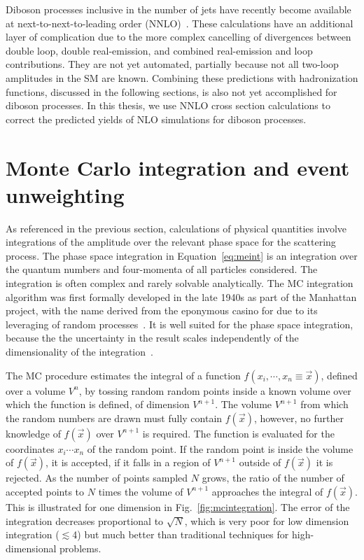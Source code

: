 Diboson processes inclusive in the number of jets have recently become available 
at next-to-next-to-leading order (NNLO)~\cite{Grazzini:2017mhc}. These calculations
have an additional layer of complication due to the more complex cancelling of
divergences between double loop, double real-emission, and combined real-emission
and loop contributions. They are not yet automated,
partially because not all two-loop amplitudes in the SM are known.
Combining these predictions with hadronization functions,
discussed in the following sections, is also not yet accomplished for diboson
processes. In this thesis, we use NNLO cross section calculations to 
correct the predicted yields of NLO simulations for diboson processes.

\section{Monte Carlo integration and event unweighting}

As referenced in the previous section, calculations of physical
quantities involve integrations of the amplitude over the relevant phase space
for the scattering process. 
The phase space integration in Equation~\ref{eq:meint}
is an integration over the quantum numbers and four-momenta of all particles 
considered. The integration is often complex and rarely solvable analytically.
The MC integration algorithm
was first formally developed in the late 1940s as part of the Manhattan project,
with the name derived from the eponymous casino for due to its leveraging
of random processes~\cite{10.2307/2280232}.
It is well suited for the phase space integration, because the
the uncertainty in the result scales independently of the dimensionality 
of the integration~\cite{doi:10.1002/wics.1314}. 

The MC procedure estimates 
the integral of a function $f(x_{i},\cdots,x_n\equiv\vec{x})$, defined over a volume $V^{n}$,
by tossing random random points inside a known volume
over which the function is defined, of dimension $V^{n+1}$. The volume $V^{n+1}$
from which the random numbers are drawn must fully contain 
$f(\vec{x})$, however, no further knowledge of $f(\vec{x})$ over $V^{n+1}$ is required. The function
is evaluated for the coordinates $x_i\cdots x_n$ of the random point.
If the random point is inside the volume of $f(\vec{x})$, it is accepted,
if it falls in a region of $V^{n+1}$ outside of $f(\vec{x})$ it is rejected.
As the number of points sampled $N$ grows, the ratio of the number of accepted
points to $N$ times the volume of $V^{n+1}$ approaches the integral of $f(\vec{x})$.
This is illustrated for one dimension in Fig.~\ref{fig:mcintegration}.
The error of the integration decreases proportional to $\sqrt{N}$, which
is very poor for low dimension integration ($\lesssim$4) but much better than
traditional techniques for high-dimensional problems.

